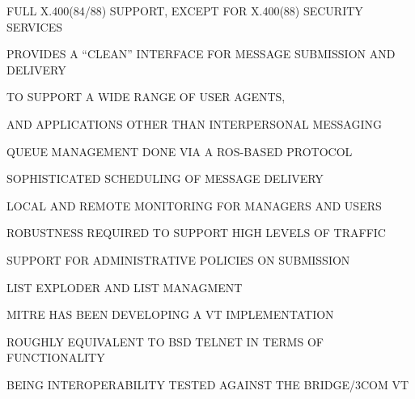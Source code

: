 \begin{bwslide}

\begin{nrtc}
\item	FULL X.400(84/88) SUPPORT, EXCEPT FOR X.400(88) SECURITY SERVICES

\item	PROVIDES A ``CLEAN'' INTERFACE FOR MESSAGE SUBMISSION AND DELIVERY
    \begin{nrtc}
    \item	TO SUPPORT A WIDE RANGE OF USER AGENTS,

    \item	AND APPLICATIONS OTHER THAN INTERPERSONAL MESSAGING
    \end{nrtc}

\item	QUEUE MANAGEMENT DONE VIA A ROS-BASED PROTOCOL
    \begin{nrtc}
    \item	SOPHISTICATED SCHEDULING OF MESSAGE DELIVERY

    \item	LOCAL AND REMOTE MONITORING FOR MANAGERS AND USERS

    \item	ROBUSTNESS REQUIRED TO SUPPORT HIGH LEVELS OF TRAFFIC

    \item	SUPPORT FOR ADMINISTRATIVE POLICIES ON SUBMISSION
    \end{nrtc}

\item	LIST EXPLODER AND LIST MANAGMENT    
\end{nrtc}
\end{bwslide}


\begin{bwslide}

\begin{nrtc}
\item	MITRE HAS BEEN DEVELOPING A VT IMPLEMENTATION

\item	ROUGHLY EQUIVALENT TO BSD TELNET IN TERMS OF FUNCTIONALITY

\item	BEING INTEROPERABILITY TESTED AGAINST THE BRIDGE/3COM VT
\end{nrtc}
\end{bwslide}


